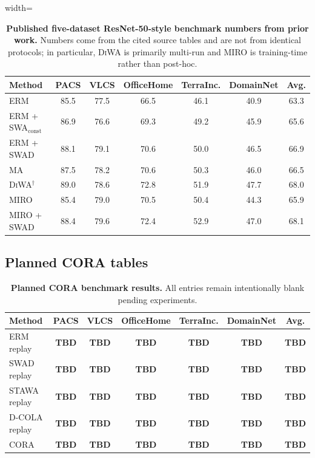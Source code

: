 \documentclass{article}
\newcommand{\TBD}{\textbf{TBD}}
\newcommand{\cora}{\textup{\textsc{CORA}}}
\newcommand{\swad}{\textup{\textsc{SWAD}}}
\newcommand{\stawa}{\textup{\textsc{STAWA}}}
\newcommand{\dcola}{\textup{\textsc{D-COLA}}}
\newcommand{\diwa}{\textup{\textsc{DiWA}}}
\newcommand{\miro}{\textup{\textsc{MIRO}}}
\begin{document}
\begin{table}[t]
    \centering
    \small
    \caption{\textbf{Published five-dataset ResNet-50-style benchmark numbers from prior work.} Numbers come from the cited source tables and are not from identical protocols; in particular, \diwa{} is primarily multi-run and \miro{} is training-time rather than post-hoc.}
    \label{tab:published}
    \begin{adjustbox}{width=\textwidth}
    \begin{tabular}{lcccccc}
        \toprule
        Method & PACS & VLCS & OfficeHome & TerraInc. & DomainNet & Avg. \\
        \midrule
        ERM \citep{cha2021swad} & 85.5 & 77.5 & 66.5 & 46.1 & 40.9 & 63.3 \\
        ERM + SWA$_{\mathrm{const}}$ \citep{cha2021swad} & 86.9 & 76.6 & 69.3 & 49.2 & 45.9 & 65.6 \\
        ERM + \swad{} \citep{cha2021swad} & 88.1 & 79.1 & 70.6 & 50.0 & 46.5 & 66.9 \\
        MA \citep{rame2022diwa} & 87.5 & 78.2 & 70.6 & 50.3 & 46.0 & 66.5 \\
        \diwa{}$^\dagger$ \citep{rame2022diwa} & 89.0 & 78.6 & 72.8 & 51.9 & 47.7 & 68.0 \\
        \miro{} \citep{cha2022miro} & 85.4 & 79.0 & 70.5 & 50.4 & 44.3 & 65.9 \\
        \miro{} + \swad{} \citep{cha2022miro} & 88.4 & 79.6 & 72.4 & 52.9 & 47.0 & 68.1 \\
        \bottomrule
    \end{tabular}
    \end{adjustbox}
\end{table}

\subsection{Planned \cora{} tables}

\begin{table}[t]
    \centering
    \small
    \caption{\textbf{Planned \cora{} benchmark results.} All entries remain intentionally blank pending experiments.}
    \label{tab:tbd}
    \begin{tabular}{lcccccc}
        \toprule
        Method & PACS & VLCS & OfficeHome & TerraInc. & DomainNet & Avg. \\
        \midrule
        ERM replay & \TBD{} & \TBD{} & \TBD{} & \TBD{} & \TBD{} & \TBD{} \\
        \swad{} replay & \TBD{} & \TBD{} & \TBD{} & \TBD{} & \TBD{} & \TBD{} \\
        \stawa{} replay & \TBD{} & \TBD{} & \TBD{} & \TBD{} & \TBD{} & \TBD{} \\
        \dcola{} replay & \TBD{} & \TBD{} & \TBD{} & \TBD{} & \TBD{} & \TBD{} \\
        \cora{} & \TBD{} & \TBD{} & \TBD{} & \TBD{} & \TBD{} & \TBD{} \\
        \bottomrule
    \end{tabular}
\end{table}
\end{document}
